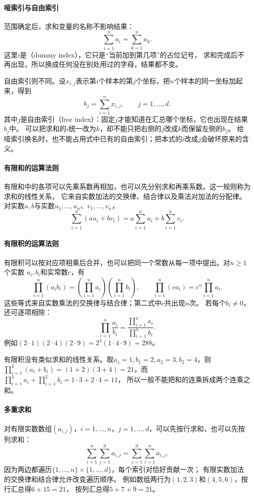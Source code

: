 \paragraph{哑索引与自由索引}
范围确定后，求和变量的名称不影响结果：
\[
  \sum_{i=1}^{n}a_i=\sum_{k=1}^{n}a_k.
\]
这里$i$是（dummy index），它只是“当前加到第几项”的占位记号，
求和完成后不再出现，所以换成任何没在别处用过的字母，结果都不变。

自由索引则不同。设$x_{i,j}$表示第$i$个样本的第$j$个坐标，把$n$个样本的同一坐标加起来，得到
\[
  b_j=\sum_{i=1}^{n}x_{i,j},\qquad j=1,\ldots,d.
\]
其中$j$是自由索引（free index）：固定$j$才能知道在汇总哪个坐标，它也出现在结果$b_j$中。
可以把求和的$i$统一改为$k$，却不能只把右侧的$j$改成$k$而保留左侧的$b_j$。
给哑索引换名时，也不能占用式中已有的自由索引；把本式的$i$改成$j$会破坏原来的含义。

\paragraph{有限和的运算法则}
有限和中的各项可以先乘系数再相加，也可以先分别求和再乘系数。这一规则称为求和的线性关系，
它来自实数加法的交换律、结合律以及乘法对加法的分配律。对实数$a,b$与实数$u_1,\ldots,u_n$、$v_1,\ldots,v_n$，
\[
  \sum_{i=1}^{n}(au_i+bv_i)
  =
  a\sum_{i=1}^{n}u_i+b\sum_{i=1}^{n}v_i.
\]

\paragraph{有限积的运算法则}
有限积可以按对应项相乘后合并，也可以把同一个常数从每一项中提出。对$n\geq1$个实数
$a_i,b_i$和实常数$c$，有
\[
 \prod_{i=1}^n(a_i b_i)
 =\left(\prod_{i=1}^n a_i\right)\left(\prod_{i=1}^n b_i\right),\qquad
 \prod_{i=1}^n(ca_i)=c^n\prod_{i=1}^n a_i.
\]
这些等式来自实数乘法的交换律与结合律；第二式中$c$共出现$n$次。
若每个$b_i\neq0$，还可逐项相除：
\[
 \prod_{i=1}^n\frac{a_i}{b_i}
 =\frac{\prod_{i=1}^n a_i}{\prod_{i=1}^n b_i}.
\]
例如$(2\cdot1)(2\cdot4)(2\cdot9)=2^3(1\cdot4\cdot9)=288$。

有限积没有类似求和的线性关系。取$a_1=1,b_1=2,a_2=3,b_2=4$，则
$\prod_{i=1}^2(a_i+b_i)=(1+2)(3+4)=21$，而$\prod_{i=1}^2a_i+\prod_{i=1}^2b_i=1\cdot3+2\cdot4=11$，
所以一般不能把和的连乘拆成两个连乘之和。

\paragraph{多重求和}
对有限实数数组$(a_{i,j})$，$i=1,\ldots,n$，$j=1,\ldots,d$，可以先按行求和，也可以先按列求和：
\[
  \sum_{i=1}^{n}\sum_{j=1}^{d}a_{i,j}
  =
  \sum_{j=1}^{d}\sum_{i=1}^{n}a_{i,j},
\]
因为两边都遍历$\{1,\ldots,n\}\times\{1,\ldots,d\}$，每个索引对恰好贡献一次；
有限实数加法的交换律和结合律允许改变遍历顺序。
例如数组两行为$(1,2,3)$和$(4,5,6)$，按行汇总得$6+15=21$，
按列汇总得$5+7+9=21$。

